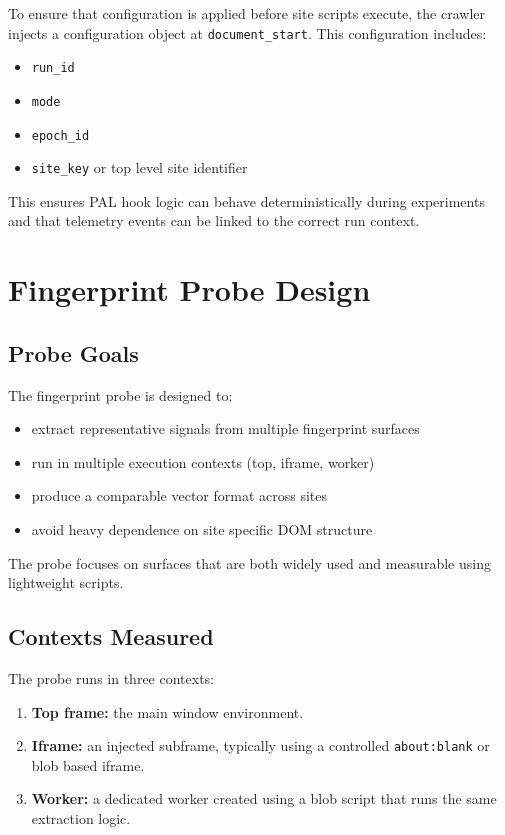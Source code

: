 \documentclass[11pt]{report}
\begin{document}
To ensure that configuration is applied before site scripts execute, the crawler injects a configuration object at \texttt{document\_start}. This configuration includes:

\begin{itemize}
    \item \texttt{run\_id}
    \item \texttt{mode}
    \item \texttt{epoch\_id}
    \item \texttt{site\_key} or top level site identifier
\end{itemize}

This ensures PAL hook logic can behave deterministically during experiments and that telemetry events can be linked to the correct run context.

\section{Fingerprint Probe Design}

\subsection{Probe Goals}

The fingerprint probe is designed to:

\begin{itemize}
    \item extract representative signals from multiple fingerprint surfaces
    \item run in multiple execution contexts (top, iframe, worker)
    \item produce a comparable vector format across sites
    \item avoid heavy dependence on site specific DOM structure
\end{itemize}

The probe focuses on surfaces that are both widely used and measurable using lightweight scripts.

\subsection{Contexts Measured}

The probe runs in three contexts:

\begin{enumerate}
    \item \textbf{Top frame:} the main window environment.
    \item \textbf{Iframe:} an injected subframe, typically using a controlled \texttt{about:blank} or blob based iframe.
    \item \textbf{Worker:} a dedicated worker created using a blob script that runs the same extraction logic.
\end{enumerate}
\end{document}
